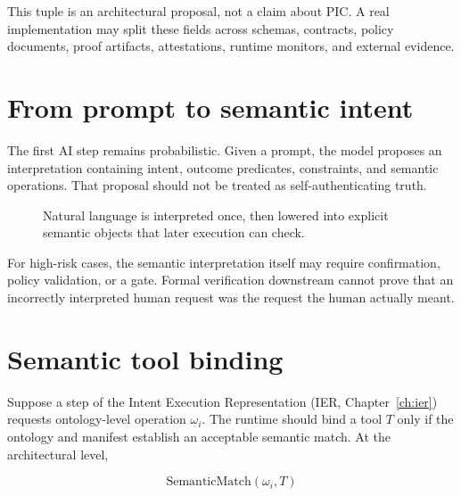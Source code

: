 \documentclass[10pt,oneside,openany]{book}
\begin{document}
This tuple is an architectural proposal, not a claim about PIC. A real implementation may split these fields across schemas, contracts, policy documents, proof artifacts, attestations, runtime monitors, and external evidence.

\section{From prompt to semantic intent}
The first AI step remains probabilistic. Given a prompt, the model proposes an interpretation containing intent, outcome predicates, constraints, and semantic operations. That proposal should not be treated as self-authenticating truth.

\begin{figure}[ht]
\centering
{}
\caption{Natural language is interpreted once, then lowered into explicit semantic objects that later execution can check.}
\end{figure}

For high-risk cases, the semantic interpretation itself may require confirmation, policy validation, or a gate. Formal verification downstream cannot prove that an incorrectly interpreted human request was the request the human actually meant.

\section{Semantic tool binding}
Suppose a step of the Intent Execution Representation (IER, Chapter~\ref{ch:ier}) requests ontology-level operation $\omega_i$. The runtime should bind a tool $T$ only if the ontology and manifest establish an acceptable semantic match. At the architectural level,

\[
\mathrm{SemanticMatch}(\omega_i,T)
\]
\end{document}
